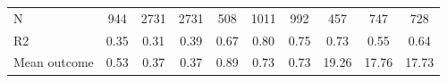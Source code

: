 \begin{tabular}{lccc|ccc|ccc}
N           &         944         &        2731         &        2731         &         508         &        1011         &         992         &         457         &         747         &         728         \\
R2          &        0.35         &        0.31         &        0.39         &        0.67         &        0.80         &        0.75         &        0.73         &        0.55         &        0.64         \\
Mean outcome&        0.53         &        0.37         &        0.37         &        0.89         &        0.73         &        0.73         &       19.26         &       17.76         &       17.73         \\
\bottomrule \end{tabular}
